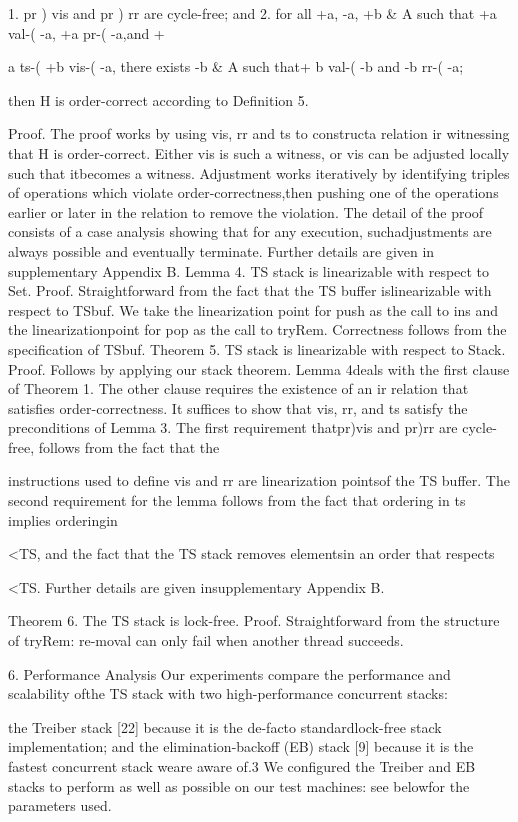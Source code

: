 1. pr ) vis and pr ) rr are cycle-free; and
2. for all +a, -a, +b & A such that +a val-( -a, +a pr-( -a,and +

a ts-( +b vis-( -a, there exists -b & A such that+
b val-( -b and -b rr-( -a;

then H is order-correct according to Definition 5.

Proof. The proof works by using vis, rr and ts to constructa relation ir witnessing that H is order-correct. Either vis is
such a witness, or vis can be adjusted locally such that itbecomes a witness. Adjustment works iteratively by identifying triples of operations which violate order-correctness,then pushing one of the operations earlier or later in the relation to remove the violation. The detail of the proof consists of a case analysis showing that for any execution, suchadjustments are always possible and eventually terminate.
Further details are given in supplementary Appendix B.
Lemma 4. TS stack is linearizable with respect to Set.
Proof. Straightforward from the fact that the TS buffer islinearizable with respect to TSbuf. We take the linearization point for push as the call to ins and the linearizationpoint for pop as the call to tryRem. Correctness follows from
the specification of TSbuf.
Theorem 5. TS stack is linearizable with respect to Stack.
Proof. Follows by applying our stack theorem. Lemma 4deals with the first clause of Theorem 1. The other clause
requires the existence of an ir relation that satisfies order-correctness. It suffices to show that vis, rr, and ts satisfy
the preconditions of Lemma 3. The first requirement thatpr)vis and pr)rr are cycle-free, follows from the fact that the

instructions used to define vis and rr are linearization pointsof the TS buffer. The second requirement for the lemma
follows from the fact that ordering in ts implies orderingin

<TS, and the fact that the TS stack removes elementsin an order that respects

<TS. Further details are given insupplementary Appendix B.

Theorem 6. The TS stack is lock-free.
Proof. Straightforward from the structure of tryRem: re-moval can only fail when another thread succeeds.

6. Performance Analysis
Our experiments compare the performance and scalability ofthe TS stack with two high-performance concurrent stacks:

the Treiber stack [22] because it is the de-facto standardlock-free stack implementation; and the elimination-backoff
(EB) stack [9] because it is the fastest concurrent stack weare aware of.3 We configured the Treiber and EB stacks to
perform as well as possible on our test machines: see belowfor the parameters used.

